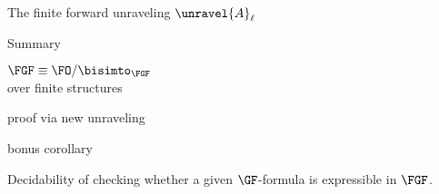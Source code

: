\documentclass[aspectratio=169]{beamer}
\begin{document}
\begin{frame}{The finite forward unraveling $\unravel{A}_{\ell}$}
  
\end{frame}


\begin{frame}{Summary}
  \begin{center}
    \huge $\FGF \equiv \FO/{\bisimto_{\FGF}}$ \\[0.5ex]
    \large over finite structures
  \end{center}

  \begin{center}
    \pause
  \begin{minipage}[t]{0.4\textwidth}
    \raggedleft

    { proof via new unraveling} \\
    
  \end{minipage}
  \hspace{4em}
  \pause
  \begin{minipage}[t]{0.4\textwidth}
    \raggedright

    { bonus corollary} \\[1ex]

    \raggedleft
    \begin{minipage}{0.9\textwidth}
      \raggedright
      Decidability of checking whether a given $\GF$-formula is expressible in $\FGF$.
    \end{minipage}
  \end{minipage}
\end{center}
\end{frame}

\appendix

%     


%   
%   

\end{document}
